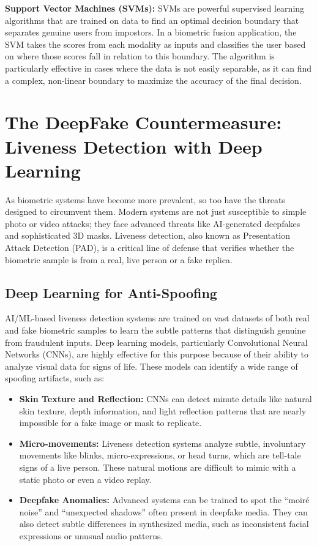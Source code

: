 \textbf{Support Vector Machines (SVMs):} SVMs are powerful supervised learning algorithms that are trained on data to find an optimal decision boundary that separates genuine users from impostors. In a biometric fusion application, the SVM takes the scores from each modality as inputs and classifies the user based on where those scores fall in relation to this boundary. The algorithm is particularly effective in cases where the data is not easily separable, as it can find a complex, non-linear boundary to maximize the accuracy of the final decision.

\section{The DeepFake Countermeasure: Liveness Detection with Deep Learning}

As biometric systems have become more prevalent, so too have the threats designed to circumvent them. Modern systems are not just susceptible to simple photo or video attacks; they face advanced threats like AI-generated deepfakes and sophisticated 3D masks. Liveness detection, also known as Presentation Attack Detection (PAD), is a critical line of defense that verifies whether the biometric sample is from a real, live person or a fake replica.

\subsection{Deep Learning for Anti-Spoofing}

AI/ML-based liveness detection systems are trained on vast datasets of both real and fake biometric samples to learn the subtle patterns that distinguish genuine from fraudulent inputs. Deep learning models, particularly Convolutional Neural Networks (CNNs), are highly effective for this purpose because of their ability to analyze visual data for signs of life. These models can identify a wide range of spoofing artifacts, such as:

\begin{itemize}
    \item \textbf{Skin Texture and Reflection:} CNNs can detect minute details like natural skin texture, depth information, and light reflection patterns that are nearly impossible for a fake image or mask to replicate.
    \item \textbf{Micro-movements:} Liveness detection systems analyze subtle, involuntary movements like blinks, micro-expressions, or head turns, which are tell-tale signs of a live person. These natural motions are difficult to mimic with a static photo or even a video replay.
    \item \textbf{Deepfake Anomalies:} Advanced systems can be trained to spot the ``moir\'e noise'' and ``unexpected shadows'' often present in deepfake media. They can also detect subtle differences in synthesized media, such as inconsistent facial expressions or unusual audio patterns.
\end{itemize}

